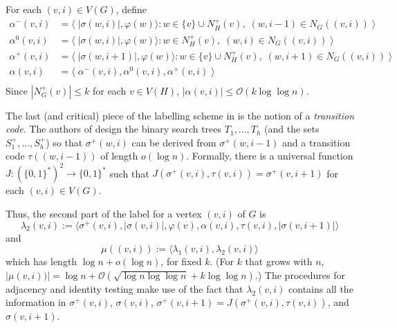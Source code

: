 \documentclass{patmorin}
\renewcommand{\le}{\leqslant}
\newcommand{\defin}[1]{\emph{\textcolor{brightmaroon}{#1}}}
\newcommand{\Oh}{\mathcal{O}}
\begin{document}

  For each $(v,i)\in V(G)$, define
  \begin{align*}
    \alpha^{-}(v,i) &= \langle\; |\sigma(w,i)|, \varphi(w)\rangle : w\in \{v\}\cup N^+_H(v),\; (w,i-1)\in N_G((v,i)) \;\rangle \\
    \alpha^{0}(v,i) &= \langle\; |\sigma(w,i)|, \varphi(w)\rangle : w\in N^+_H(v),\; (w,i)\in N_G((v,i)) \;\rangle \\
    \alpha^+(v,i) &= \langle\; |\sigma(w,i+1)|, \varphi(w)\rangle : w\in \{v\}\cup N^+_H(v),\; (w,i+1)\in N_G((v,i)) \;\rangle \\
    \alpha(v,i) &= \langle\; \alpha^-(v,i),\alpha^0(v,i),\alpha^+(v,i) \;\rangle \\
  \end{align*}
  Since $|N^+_G(v)|\le k$ for each $v\in V(H)$, $|\alpha(v,i)|\le\Oh(k\log\log n)$.

  The last (and critical) piece of the labelling scheme in \cite{dujmovic.esperet.ea:adjacency} is the notion of a \defin{transition code}. The authors of \cite{dujmovic.esperet.ea:adjacency} design the binary search trees $T_1,\ldots,T_h$ (and the sets $S^+_1,\ldots,S^+_h$) so that $\sigma^+(w,i)$ can be derived from $\sigma^+(w,i-1)$ and a transition code \defin{$\tau((w,i-1))$} of length $o(\log n)$. Formally, there is a universal function $J:(\{0,1\}^*)^2\to\{0,1\}^*$ such that $J(\sigma^+(v,i),\tau(v,i))=\sigma^+(v,i+1)$ for each $(v,i)\in V(G)$.

  Thus, the second part of the label for a vertex $(v,i)$ of $G$ is
  \[
    \lambda_2(v,i) := \langle \sigma^+(v,i), |\sigma(v,i)|, \varphi(v),\alpha(v,i),\tau(v,i),|\sigma(v,i+1)| \rangle
  \]
  and
  \[
    \mu((v,i)) := \langle \lambda_1(v,i), \lambda_2(v,i) \rangle
  \]
  which has length $\log n + o(\log n)$, for fixed $k$.  (For $k$ that grows with $n$, $|\mu(v,i))|=\log n + \Oh(\sqrt{\log n\log\log n} + k\log\log n)$.)
  The procedures for adjacency and identity testing make use of the fact that $\lambda_2(v,i)$ contains all the information in $\sigma^+(v,i)$, $\sigma(v,i)$, $\sigma^+(v,i+1)=J(\sigma^+(v,i),\tau(v,i))$, and $\sigma(v,i+1)$.
\end{document}

